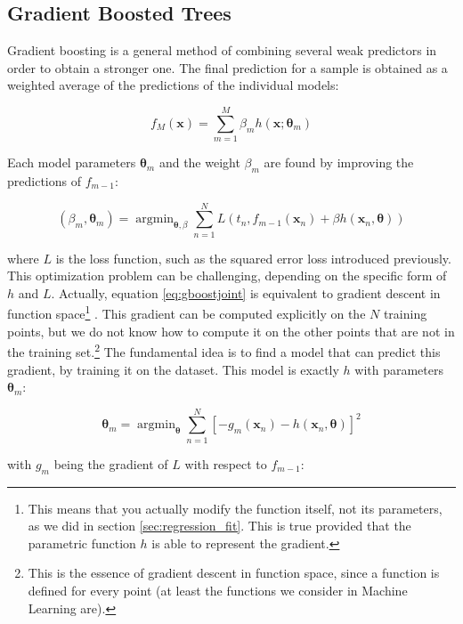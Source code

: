 \documentclass[a4paper,11pt]{kth-mag}
\DeclareMathOperator*{\argmin}{argmin}
\begin{document}
\subsection{Gradient Boosted Trees}
\label{sec:gbt}
Gradient boosting \citep{gradientboosting} is a general method of combining several weak predictors in order to obtain a stronger one. The final prediction for a sample is obtained as a weighted average of the predictions of the individual models:

\begin{equation}
\label{eq:gboost}
f_M(\bm x)=\sum_{m=1}^M \beta_m h(\bm x;\bm\theta_m)
\end{equation}

Each model parameters $\bm\theta_m$ and the weight $\beta_m$ are found by improving the predictions of $f_{m-1}$:

\begin{equation}
\label{eq:gboostjoint}
(\beta_m, \bm\theta_m)=\argmin_{\bm\theta,\beta}\sum_{n=1}^N L\left(
t_n, f_{m-1}(\bm x_n)+\beta h(\bm x_n,\bm\theta)
\right)
\end{equation}

\noindent where $L$ is the loss function, such as the squared error loss introduced previously. This optimization problem can be challenging, depending on the specific form of $h$ and $L$. Actually, equation \ref{eq:gboostjoint} is equivalent to gradient descent in function space\footnote{This means that you actually modify the function itself, not its parameters, as we did in section \ref{sec:regression_fit}. This is true provided that the parametric function $h$ is able to represent the gradient.} \citep{boostinggd,greedyboosting}. This gradient can be computed explicitly on the $N$ training points, but we do not know how to compute it on the other points that are not in the training set.\footnote{This is the essence of gradient descent in function space, since a function is defined for every point (at least the functions we consider in Machine Learning are).} The fundamental idea is to find a model that can predict this gradient, by training it on the dataset. This model is exactly $h$ with parameters $\bm\theta_m$:

\begin{equation}
\label{eq:gbtheta}
\bm\theta_m=\argmin_{\bm\theta}\sum_{n=1}^N \left[
-g_m(\bm x_n)-h(\bm x_n,\bm\theta)
\right]^2
\end{equation}

\noindent with $g_m$ being the gradient of $L$ with respect to $f_{m-1}$:
\end{document}

